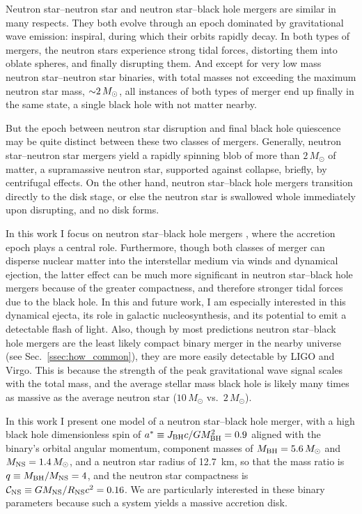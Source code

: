 Neutron star--neutron star \nsns and neutron star--black hole \nsbh mergers are
similar in many respects. They both evolve through an epoch dominated by
gravitational wave emission: inspiral, during which their orbits rapidly decay.
In both types of mergers, the neutron stars experience strong tidal forces,
distorting them into oblate spheres, and finally disrupting them.
And except for very low mass neutron star--neutron star \nsns binaries, with
total masses not exceeding the maximum neutron star mass, $\mathord{\sim}2\,M_\odot$,
all instances of both types of merger end up finally in the same state, a
single black hole with not matter nearby.

But the epoch between neutron star disruption and final black hole quiescence
may be quite distinct between these two classes of mergers. Generally, neutron
star--neutron star \nsns mergers yield a rapidly spinning blob of more than
$2\,M_\odot$ of matter, a supramassive neutron star,
supported against collapse, briefly, by centrifugal effects.
On the other hand, neutron star--black hole \nsbh mergers transition directly
to the disk stage, or else the neutron star is swallowed whole immediately upon
disrupting, and no disk forms.

In this work I focus on neutron star--black hole mergers \nsbh, where the
accretion epoch plays a central role. Furthermore, though both classes of
merger can disperse nuclear matter into the interstellar medium via winds and
dynamical ejection, the latter effect can be much more significant
in neutron star--black hole
mergers because of the greater compactness, and therefore stronger
tidal forces due to the black hole. In this and future work, I am especially
interested in this dynamical ejecta, its role in galactic nucleosynthesis,
and its potential to emit a detectable flash of light. Also, though by most
predictions neutron star--black hole mergers are the least likely compact
binary merger in the nearby universe (see Sec.~\ref{ssec:how_common}),
they are more easily detectable by LIGO and Virgo. This is because the
strength of the peak gravitational wave signal scales with the total mass,
and the average stellar mass black hole is likely many times as massive as the
average neutron star ($10\,M_\odot$ vs.\ $2\,M_\odot$).

In this work I present one model of a neutron star--black hole merger,
with a high black hole dimensionless spin of
$a^* \equiv J_{\rm BH}c/GM_{\rm BH}^2 =0.9$ aligned with the binary's orbital
angular momentum,
component masses of $M_{\rm BH}=5.6\,M_\odot$ and
$M_{\rm NS}=1.4\,M_\odot$,
and a neutron star radius of 12.7~km,
so that the mass ratio is $q \equiv M_{\rm BH}/M_{\rm NS}=4$,
and the neutron star compactness is
$\mathcal{C}_{\rm NS} \equiv G M_{\rm NS}/R_{\rm NS}c^2=0.16$.
We are particularly interested in these binary parameters because such a system
yields a massive accretion disk.

